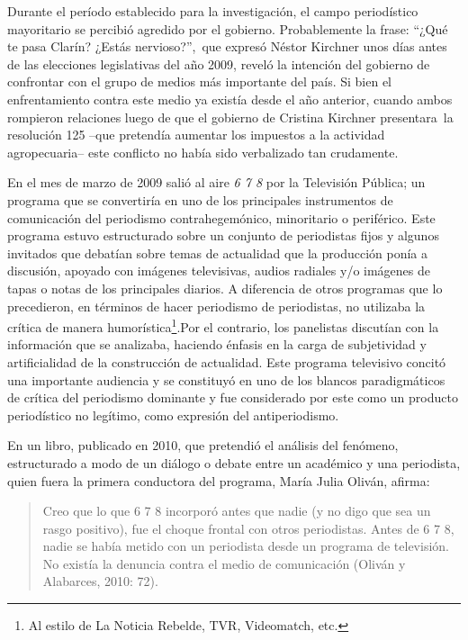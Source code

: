 {Durante el período establecido para la investigación, el campo periodístico mayoritario se percibió agredido por el gobierno. Probablemente la frase: ``¿Qué te pasa Clarín? ¿Estás nervioso?'',~que expresó Néstor Kirchner unos días antes de las elecciones legislativas del año 2009, reveló la intención del gobierno de confrontar con el grupo de medios más importante del país. Si bien el enfrentamiento contra este medio ya existía desde el año anterior, cuando ambos rompieron relaciones luego de que el gobierno de Cristina Kirchner presentara~la resolución 125 --que pretendía aumentar los impuestos a la actividad agropecuaria-- este conflicto no había sido verbalizado tan crudamente.

En el mes de marzo de 2009 salió al aire \emph{6 7 8} por la Televisión Pública; un programa que se convertiría en uno de los principales instrumentos de comunicación del periodismo contrahegemónico, minoritario o periférico. Este programa estuvo estructurado sobre un conjunto de periodistas fijos y algunos invitados que debatían sobre temas de actualidad que la producción ponía a discusión, apoyado con imágenes televisivas, audios radiales y/o imágenes de tapas o notas de los principales diarios. A diferencia de otros programas que lo precedieron, en términos de hacer periodismo de periodistas, no utilizaba la crítica de manera humorística\footnote{Al estilo de La Noticia Rebelde, TVR, Videomatch, etc.}.Por el contrario, los panelistas discutían con la información que se analizaba, haciendo énfasis en la carga de subjetividad y artificialidad de la construcción de actualidad. Este programa televisivo concitó una importante audiencia y se constituyó en uno de los blancos paradigmáticos de crítica del periodismo dominante y fue considerado por este como un producto periodístico no legítimo, como expresión del antiperiodismo.

En un libro, publicado en 2010, que pretendió el análisis del fenómeno, estructurado a modo de un diálogo o debate entre un académico y una periodista, quien fuera la primera conductora del programa, María Julia Oliván, afirma:

\begin{quote}
Creo que lo que 6 7 8 incorporó antes que nadie (y no digo que sea un rasgo positivo), fue el choque frontal con otros periodistas. Antes de 6 7 8, nadie se había metido con un periodista desde un programa de televisión. No existía la denuncia contra el medio de comunicación (Oliván y Alabarces, 2010: 72).
\end{quote}

}
